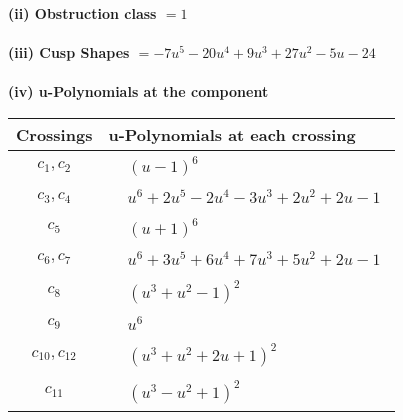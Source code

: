 \documentclass[1p]{elsarticle_modified}
\theoremstyle{definition}
\begin{document}
\flushleft \textbf{(ii) Obstruction class $= 1$}\\~\\
\flushleft \textbf{(iii) Cusp Shapes $= -7 u^5-20 u^4+9 u^3+27 u^2-5 u-24$}\\~\\
\newpage\renewcommand{\arraystretch}{1}
\flushleft \textbf{(iv) u-Polynomials at the component}\newline \\
\begin{tabular}{m{50pt}|m{274pt}}
Crossings & \hspace{64pt}u-Polynomials at each crossing \\
\hline $$\begin{aligned}c_{1},c_{2}\end{aligned}$$&$\begin{aligned}
&(u-1)^6
\end{aligned}$\\
\hline $$\begin{aligned}c_{3},c_{4}\end{aligned}$$&$\begin{aligned}
&u^6+2 u^5-2 u^4-3 u^3+2 u^2+2 u-1
\end{aligned}$\\
\hline $$\begin{aligned}c_{5}\end{aligned}$$&$\begin{aligned}
&(u+1)^6
\end{aligned}$\\
\hline $$\begin{aligned}c_{6},c_{7}\end{aligned}$$&$\begin{aligned}
&u^6+3 u^5+6 u^4+7 u^3+5 u^2+2 u-1
\end{aligned}$\\
\hline $$\begin{aligned}c_{8}\end{aligned}$$&$\begin{aligned}
&(u^3+u^2-1)^2
\end{aligned}$\\
\hline $$\begin{aligned}c_{9}\end{aligned}$$&$\begin{aligned}
&u^6
\end{aligned}$\\
\hline $$\begin{aligned}c_{10},c_{12}\end{aligned}$$&$\begin{aligned}
&(u^3+u^2+2 u+1)^2
\end{aligned}$\\
\hline $$\begin{aligned}c_{11}\end{aligned}$$&$\begin{aligned}
&(u^3- u^2+1)^2
\end{aligned}$\\
\hline
\end{tabular}\\~\\
\end{document}
